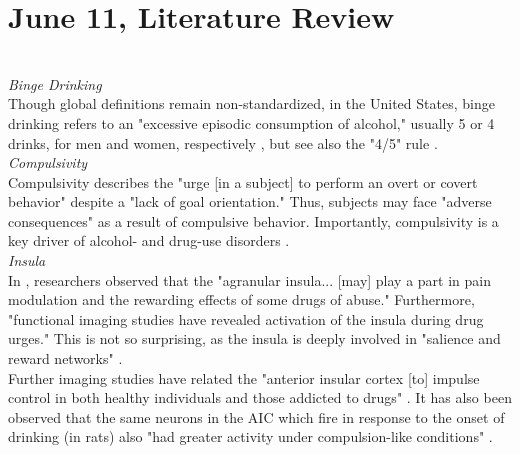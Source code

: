 \documentclass[center]{hayektex}
\title{}
\subtitle{A subtitle}
\author{Your name}
\begin{document}
\renewcommand{\arraystretch}{2}
	\section{June 11, Literature Review}
	\\\textit{Binge Drinking}
	\\Though global definitions remain non-standardized, in the United States, binge drinking refers to an "excessive episodic consumption of alcohol," usually 5 or 4 drinks, for men and women, respectively \cite{stolle}, but see also the "4/5" rule \cite{fillmore}.
	\\\textit{Compulsivity}
	\\Compulsivity describes the "urge [in a subject] to perform an overt or covert behavior" despite a "lack of goal orientation." Thus, subjects may face "adverse consequences" as a result of compulsive behavior. Importantly, compulsivity is a key driver of alcohol- and drug-use disorders \cite{burchi}.
	\\\textit{Insula}
	\\In \cite{naqvi}, researchers observed that the "agranular insula... [may] play a part in pain modulation and the rewarding effects of some drugs of abuse." Furthermore, "functional imaging studies have revealed activation of the insula during drug urges." This is not so surprising, as the insula is deeply involved in "salience and reward networks" \cite{radhakrishnan}.
	\\Further imaging studies have related the "anterior insular cortex [to] impulse control in both healthy individuals and those addicted to drugs" \cite{belin, dambacher, ersche}. It has also been observed that the same neurons in the AIC which fire in response to the onset of drinking (in rats) also "had greater activity under compulsion-like conditions" \cite{hopf}.
	\newpage{}

%	
	
	{}
	
\end{document}
